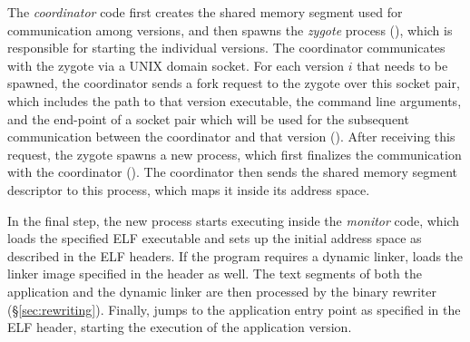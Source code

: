 

The \emph{coordinator} code first creates the shared memory segment
used for communication among versions, and then spawns the
\textit{zygote} process (), which is responsible for starting
the individual versions. The coordinator communicates with the zygote
via a UNIX domain socket. For each version $i$ that needs to be spawned,
the coordinator sends a fork request to the zygote over this socket
pair, which includes the path to that version executable, the command
line arguments, and the end-point of a socket pair which will be used
for the subsequent communication between the coordinator and that
version ().
%
After receiving this request, the zygote spawns a new process, which
first finalizes the communication with the coordinator
().  The coordinator then sends the shared memory
segment descriptor to this process, which maps it inside its address
space.


In the final step, the new process starts executing inside the
\emph{monitor} code, which loads the specified ELF executable and sets
up the initial address space as described in the ELF headers. If the
program requires a dynamic linker, \nx loads the linker image specified
in the header as well.
The text segments of both the application and the dynamic linker are
then processed by the binary rewriter (\S\ref{sec:rewriting}). Finally,
\nx jumps to the application entry point as specified in the ELF header,
starting the execution of the application version.


